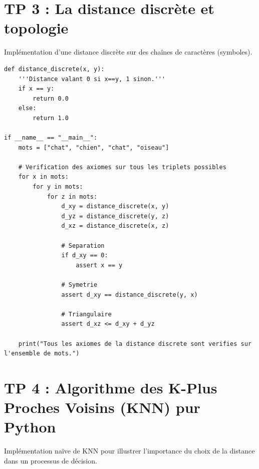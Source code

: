 \documentclass[11pt,a4paper]{article}
\begin{document}
\section*{TP 3 : La distance discrète et topologie}

Implémentation d'une distance discrète sur des chaînes de caractères (symboles).

\begin{lstlisting}
def distance_discrete(x, y):
    '''Distance valant 0 si x==y, 1 sinon.'''
    if x == y:
        return 0.0
    else:
        return 1.0

if __name__ == "__main__":
    mots = ["chat", "chien", "chat", "oiseau"]

    # Verification des axiomes sur tous les triplets possibles
    for x in mots:
        for y in mots:
            for z in mots:
                d_xy = distance_discrete(x, y)
                d_yz = distance_discrete(y, z)
                d_xz = distance_discrete(x, z)

                # Separation
                if d_xy == 0:
                    assert x == y

                # Symetrie
                assert d_xy == distance_discrete(y, x)

                # Triangulaire
                assert d_xz <= d_xy + d_yz

    print("Tous les axiomes de la distance discrete sont verifies sur l'ensemble de mots.")
\end{lstlisting}

\section*{TP 4 : Algorithme des K-Plus Proches Voisins (KNN) pur Python}

Implémentation naïve de KNN pour illustrer l'importance du choix de la distance dans un processus de décision.
\end{document}

